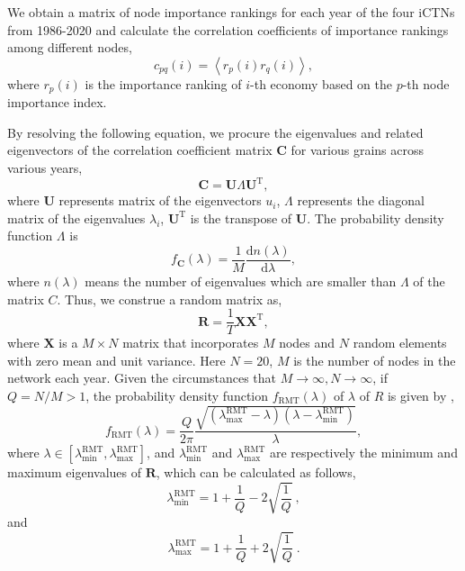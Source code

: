 \documentclass[preprint,3p,times,sort&compress]{elsarticle}
\begin{document}
We obtain a matrix of node importance rankings for each year of the four iCTNs from 1986-2020 and calculate the correlation coefficients of importance rankings among different nodes,
\begin{equation}
\label{Eq:C:correlation}
c_{pq}(i)=\left\langle r_{p}(i) r_{q}(i)\right\rangle,
\end{equation}
where $r_{p}(i)$ is the importance ranking of $i$-th economy based on the $p$-th node importance index.



By resolving the following equation, we procure the eigenvalues and related eigenvectors of the correlation coefficient matrix $\mathbf{C}$ for various grains across various years,
\begin{equation}
    \mathbf{C}=\mathbf{U} \Lambda \mathbf{U}^{\mathrm{T}},
    \label{Eq:C:eigenvalue}
\end{equation}
where $\mathbf{U}$ represents matrix of the eigenvectors $u_i$, $\Lambda$ represents the diagonal matrix of the eigenvalues $\lambda_i$, $\mathbf{U}^{\mathrm{T}}$ is the transpose of $\mathbf{U}$. The probability density function $\Lambda$ is  %
\begin{equation}
  f_{\mathbf{C}}(\lambda)=\frac{1}{M} \frac{\mathrm{d} n(\lambda)}{\mathrm{d} \lambda},
  \label{Eq:C:PDF:eigenvalue}
\end{equation}
where $n(\lambda)$ means the number of eigenvalues which are smaller than $\Lambda$ of the matrix $C$. Thus, we construe a random matrix as, 
\begin{equation}
    \mathbf{R}=\frac{1}{T} \mathbf{X} \mathbf{X}^{\mathrm{T}},
    \label{Eq:RMT:define}
\end{equation}
where ${\mathbf{X}}$ is a $M \times N$ matrix that incorporates $M$ nodes and $N$ random elements with zero mean and unit variance. Here $N=20$, $M$ is the number of nodes in the network each year. Given the circumstances that $M \rightarrow \infty, N \rightarrow \infty$, if $Q=N / M>1$, the probability density function $f_{\mathrm{RMT}}(\lambda)$ of $\lambda$ of $R$ is given by \cite{Edelman-1988-SIAMjmaa,Laloux-Cizeau-Bouchaud-Potters-1999-PhysRevLett,Sengupta-Mitra-1999-PhysRevE},
\begin{equation}
    f_{\mathrm{RMT}}(\lambda)=\frac{Q}{2 \pi} \frac{\sqrt{\left(\lambda_{\max }^{\mathrm{RMT}}-\lambda\right)\left(\lambda-\lambda_{\min }^{\mathrm{RMT}}\right)}}{\lambda},
    \label{Eq:RMT:PDF:eigenvalue}
\end{equation}
where $\lambda \in\left[\lambda_{\min }^{\mathrm{RMT}}, \lambda_{\max }^{\mathrm{RMT}}\right]$, and $\lambda_{\min }^{\mathrm{RMT}}$ and $\lambda_{\max }^{\mathrm{RMT}}$ are respectively the minimum and maximum eigenvalues of $\mathbf{R}$, which can be calculated as follows,
\begin{equation}
    \lambda_{\min }^{\mathrm{RMT}}=1+\frac{1}{Q}-2 \sqrt{\frac{1}{Q}}~,
    \label{Eq:RMT:eigenvalue:min}
\end{equation}
and
\begin{equation}
\label{Eq:RMT:eigenvalue:max}
\lambda_{\max}^{\mathrm{RMT}}=1+\frac{1}{Q}+2\sqrt{\frac{1}{Q}}~.
\end{equation}
\end{document}
